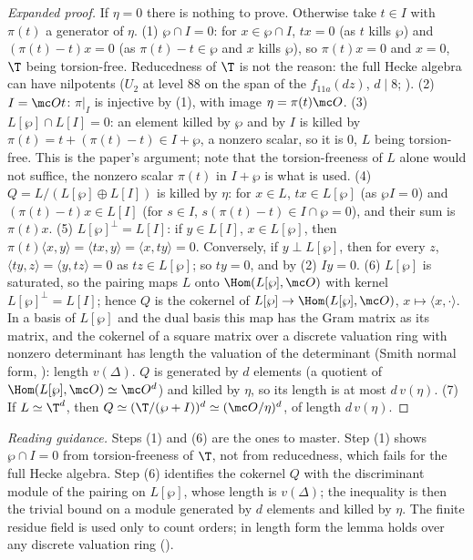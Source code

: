 \begin{sloppypar}
\begin{proof}[Expanded proof]
If $\eta=0$ there is nothing to prove. Otherwise take $t\in I$ with $\pi(t)$ a generator of $\eta$.
(1) $\wp\cap I=0$: for $x\in\wp\cap I$, $tx=0$ (as $t$ kills $\wp$) and $(\pi(t)-t)x=0$ (as $\pi(t)-t\in\wp$ and $x$ kills $\wp$), so $\pi(t)x=0$ and $x=0$, $\T$ being torsion-free. Reducedness of $\T$
is not the reason: the full Hecke algebra can have nilpotents ($U_2$ at level $88$ on the span of the $f_{11a}(dz)$, $d\mid8$; ).
(2) $I=\mc Ot$: $\pi|_I$ is injective by (1), with image $\eta=\pi(t)\mc O$.
(3) $L[\wp]\cap L[I]=0$: an element killed by $\wp$ and by $I$ is killed by $\pi(t)=t+(\pi(t)-t)\in I+\wp$, a nonzero scalar, so it is $0$, $L$ being torsion-free. This is the paper's argument; note that the
torsion-freeness of $L$ alone would not suffice, the nonzero scalar $\pi(t)$ in $I+\wp$ is what is used.
(4) $Q=L/(L[\wp]\oplus L[I])$ is killed by $\eta$: for $x\in L$, $tx\in L[\wp]$ (as $\wp I=0$) and $(\pi(t)-t)x\in L[I]$ (for $s\in I$, $s(\pi(t)-t)\in I\cap\wp=0$), and their sum is $\pi(t)x$.
(5) $L[\wp]^\perp=L[I]$: if $y\in L[I]$, $x\in L[\wp]$, then $\pi(t)\langle x,y\rangle=\langle tx,y\rangle=\langle x,ty\rangle=0$. Conversely, if $y\perp L[\wp]$, then for every $z$, $\langle ty,z\rangle=\langle y,tz\rangle=0$ as
$tz\in L[\wp]$; so $ty=0$, and by (2) $Iy=0$.
(6) $L[\wp]$ is saturated, so the pairing maps $L$ onto $\Hom(L[\wp],\mc O)$ with kernel $L[\wp]^\perp=L[I]$; hence $Q$ is the cokernel of $L[\wp]\to\Hom(L[\wp],\mc O)$, $x\mapsto\langle x,\cdot\rangle$. In a basis of $L[\wp]$ and the dual basis this map has the Gram matrix as its matrix, and the
cokernel of a square matrix over a discrete valuation ring with nonzero determinant has length the valuation of the determinant (Smith normal form, ): length $v(\Delta)$. $Q$ is
generated by $d$ elements (a quotient of $\Hom(L[\wp],\mc O)\simeq\mc O^d$) and killed by $\eta$, so its length is at most $d\,v(\eta)$.
(7) If $L\simeq\T^d$, then $Q\simeq(\T/(\wp+I))^d\simeq(\mc O/\eta)^d$, of length $d\,v(\eta)$.
\end{proof}

\noindent\emph{Reading guidance.} Steps (1) and (6) are the ones to master. Step (1) shows $\wp\cap I=0$ from torsion-freeness of $\T$, not from reducedness, which fails for
the full Hecke algebra. Step (6) identifies the cokernel $Q$ with the discriminant module of the pairing on $L[\wp]$, whose length is $v(\Delta)$; the inequality is then
the trivial bound on a module generated by $d$ elements and killed by $\eta$. The finite residue field is used only to count orders; in length form the lemma holds over any
discrete valuation ring ().


\end{sloppypar}
